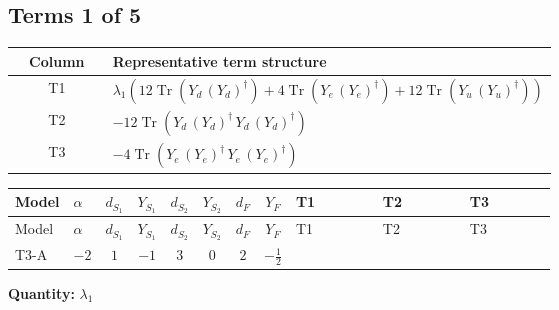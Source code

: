 \documentclass[8pt]{article}
\begin{document}
\begin{landscape}
\subsection*{Terms 1 of 5}
\begin{center}
\begin{tabular}{@{}c >{\raggedright\arraybackslash}p{0.82\linewidth}@{}}
\toprule
Column & Representative term structure \\
\midrule
T1 & \(\displaystyle {\lambda_1} (12 \operatorname{Tr}\!\left({Y_d}\,\left({Y_d}\right)^{\dagger}\right)+4 \operatorname{Tr}\!\left({Y_e}\,\left({Y_e}\right)^{\dagger}\right)+12 \operatorname{Tr}\!\left({Y_u}\,\left({Y_u}\right)^{\dagger}\right))\) \\
\midrule
T2 & \(\displaystyle -12 \operatorname{Tr}\!\left({Y_d}\,\left({Y_d}\right)^{\dagger}\,{Y_d}\,\left({Y_d}\right)^{\dagger}\right)\) \\
\midrule
T3 & \(\displaystyle -4 \operatorname{Tr}\!\left({Y_e}\,\left({Y_e}\right)^{\dagger}\,{Y_e}\,\left({Y_e}\right)^{\dagger}\right)\) \\
\midrule
\bottomrule
\end{tabular}
\end{center}
\smallskip
\tiny
\begin{longtable}{@{}llcccccc >{\raggedright\arraybackslash}p{0.21\linewidth} >{\raggedright\arraybackslash}p{0.21\linewidth} >{\raggedright\arraybackslash}p{0.21\linewidth}@{}}
\toprule
Model & $\alpha$ & $d_{S_1}$ & $Y_{S_1}$ & $d_{S_2}$ & $Y_{S_2}$ & $d_F$ & $Y_F$ & T1 & T2 & T3 \\
\midrule
\endfirsthead
\toprule
Model & $\alpha$ & $d_{S_1}$ & $Y_{S_1}$ & $d_{S_2}$ & $Y_{S_2}$ & $d_F$ & $Y_F$ & T1 & T2 & T3 \\
\midrule
\endhead
T3-A & $-2$ & $1$ & $-1$ & $3$ & $0$ & $2$ & $-\frac{1}{2}$ & \scriptsize\adjustbox{max width=\linewidth}{$\begin{gathered} {\lambda_1} (12 \operatorname{Tr}\!\left({Y_d}\,\left({Y_d}\right)^{\dagger}\right)+4 \operatorname{Tr}\!\left({Y_e}\,\left({Y_e}\right)^{\dagger}\right)+12 \operatorname{Tr}\!\left({Y_u}\,\left({Y_u}\right)^{\dagger}\right))\end{gathered}$} & \scriptsize\adjustbox{max width=\linewidth}{$\begin{gathered} -12 \operatorname{Tr}\!\left({Y_d}\,\left({Y_d}\right)^{\dagger}\,{Y_d}\,\left({Y_d}\right)^{\dagger}\right)\end{gathered}$} & \scriptsize\adjustbox{max width=\linewidth}{$\begin{gathered} -4 \operatorname{Tr}\!\left({Y_e}\,\left({Y_e}\right)^{\dagger}\,{Y_e}\,\left({Y_e}\right)^{\dagger}\right)\end{gathered}$} \\
\midrule
\bottomrule
\end{longtable}
\clearpage
\noindent\textbf{Quantity: }$\lambda_1$\par\smallskip

\end{landscape}
\end{document}
